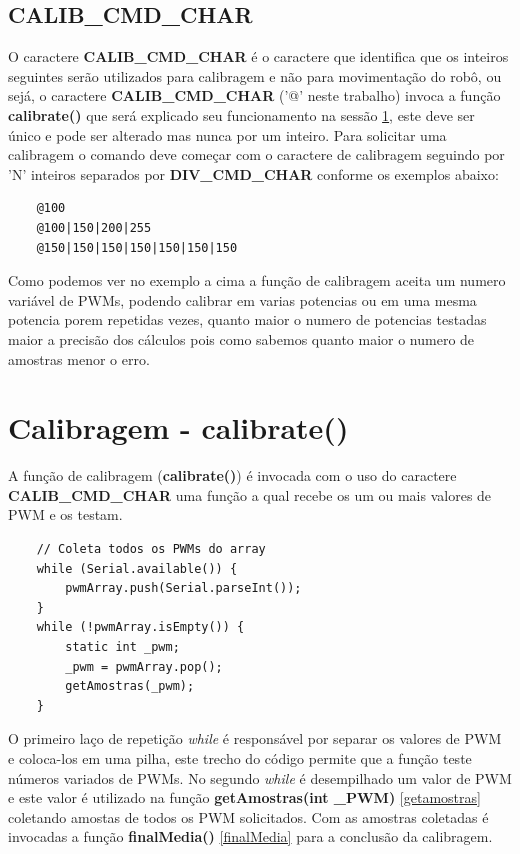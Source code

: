 \documentclass[a4paper,12pt,portuguese]{ufms-cpcx}
\begin{document}
\subsection{CALIB\_CMD\_CHAR}\label{calibcmd}
O caractere \textbf{CALIB\_CMD\_CHAR} é o caractere que identifica que os inteiros seguintes serão utilizados para calibragem e não para movimentação do robô, ou sejá, o caractere \textbf{CALIB\_CMD\_CHAR} ('@' neste trabalho) invoca a função \textbf{calibrate()} que será explicado seu funcionamento na sessão \ref{calibrate}, este deve ser único e pode ser alterado mas nunca por um inteiro.
Para solicitar uma calibragem o comando deve começar com o caractere de calibragem seguindo por 'N' inteiros separados por \textbf{DIV\_CMD\_CHAR} conforme os exemplos abaixo:
\begin{lstlisting}
	@100
	@100|150|200|255
	@150|150|150|150|150|150|150
\end{lstlisting}
Como podemos ver no exemplo a cima a função de calibragem aceita um numero variável de PWMs, podendo calibrar em varias potencias ou em uma mesma potencia porem repetidas vezes, quanto maior o numero de potencias testadas maior a precisão dos cálculos pois como sabemos quanto maior o numero de amostras menor o erro.

\section{Calibragem - calibrate()}\label{calibrate}
A função de calibragem (\textbf{calibrate()}) é invocada com o uso do caractere \textbf{CALIB\_CMD\_CHAR} uma função a qual recebe os um ou mais valores de PWM e os testam.
\begin{lstlisting}
	// Coleta todos os PWMs do array
	while (Serial.available()) {
		pwmArray.push(Serial.parseInt());
	}
	while (!pwmArray.isEmpty()) {
		static int _pwm;
		_pwm = pwmArray.pop();
		getAmostras(_pwm);
	}
\end{lstlisting}
O primeiro laço de repetição \textit{while} é responsável por separar os valores de PWM e coloca-los em uma pilha, este trecho do código permite que a função teste números variados de PWMs.
No segundo \textit{while} é desempilhado um valor de PWM e este valor é utilizado na função \textbf{getAmostras(int \_PWM)} \ref{getamostras} coletando amostas de todos os PWM solicitados. Com as amostras coletadas é invocadas a função \textbf{finalMedia()} \ref{finalMedia} para a conclusão da calibragem.
\end{document}
